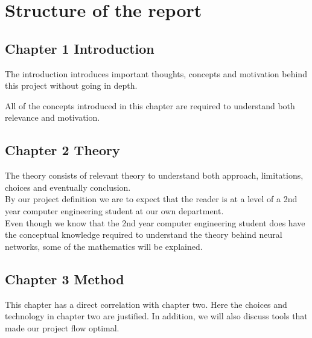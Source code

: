 \section{Structure of the report}
\subsection{Chapter 1 Introduction}
The introduction introduces important thoughts, concepts and motivation behind this project without going in depth.

All of the concepts introduced in this chapter are required to understand both relevance and motivation.

\subsection{Chapter 2 Theory}
The theory consists of relevant theory to understand both approach, limitations, choices and eventually conclusion.\\
By our project definition we are to expect that the reader is at a level of a 2nd year computer engineering student at our own department. \\
Even though we know that the 2nd year computer engineering student does have the conceptual knowledge required to understand the theory behind neural networks, some of the mathematics will be explained.

\subsection{Chapter 3 Method}
This chapter has a direct correlation with chapter two. Here the choices and technology in chapter two are justified. 
In addition, we will also discuss tools that made our project flow optimal.


